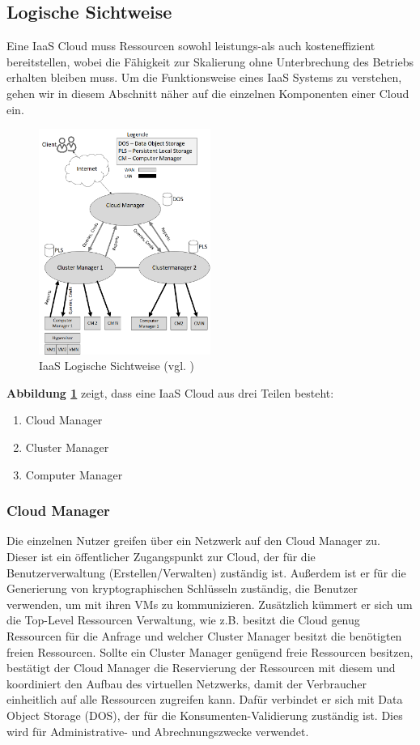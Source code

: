 \subsection{Logische Sichtweise}
Eine IaaS Cloud muss Ressourcen sowohl leistungs-als auch kosteneffizient bereitstellen, wobei die Fähigkeit zur Skalierung ohne Unterbrechung des Betriebs erhalten bleiben muss.
Um die Funktionsweise eines IaaS Systems zu verstehen, gehen wir in diesem Abschnitt näher auf die einzelnen Komponenten einer Cloud ein.
\begin{figure}[h]
    \centering
	\includegraphics[width=0.5\textwidth]{Images/IaaSLogic}
	\caption{IaaS Logische Sichtweise (vgl. \cite{Badger})}
	\label{IaaSLogic}
\end{figure}
\textbf{Abbildung \ref{IaaSLogic}} zeigt, dass eine IaaS Cloud aus drei Teilen besteht:
\begin{enumerate}
	\item Cloud Manager
	\item Cluster Manager
	\item Computer Manager
\end{enumerate}

\subsubsection{Cloud Manager}
Die einzelnen Nutzer greifen über ein Netzwerk auf den Cloud Manager zu. Dieser ist ein öffentlicher Zugangspunkt zur Cloud, der für die Benutzerverwaltung (Erstellen/Verwalten) zuständig ist. 
Außerdem ist er für die Generierung von kryptographischen Schlüsseln zuständig, die Benutzer verwenden, um mit ihren VMs zu kommunizieren.
Zusätzlich kümmert er sich um die Top-Level Ressourcen Verwaltung, wie z.B. besitzt die Cloud genug Ressourcen für die Anfrage und welcher Cluster Manager besitzt die benötigten freien Ressourcen.
Sollte ein Cluster Manager genügend freie Ressourcen besitzen, bestätigt der Cloud Manager die Reservierung der Ressourcen mit diesem und koordiniert den Aufbau des virtuellen Netzwerks, damit der Verbraucher einheitlich auf alle Ressourcen zugreifen kann.
Dafür verbindet er sich mit Data Object Storage (DOS), der für die Konsumenten-Validierung zuständig ist. Dies wird für Administrative- und Abrechnungszwecke verwendet\cite{Badger}.

